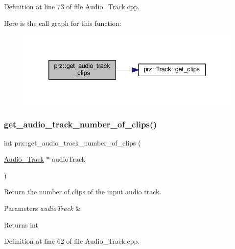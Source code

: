 Definition at line 73 of file Audio\+\_\+\+Track.\+cpp.

Here is the call graph for this function\+:
\nopagebreak
\begin{figure}[H]
\begin{center}
\leavevmode
\includegraphics[width=326pt]{namespaceprz_a291fc379c9ff52af1a7aaa0ac7736567_cgraph}
\end{center}
\end{figure}
\mbox{\label{namespaceprz_a8f5ec57a63ae029d8417d533e30965f4}} 
\subsubsection{\texorpdfstring{get\_audio\_track\_number\_of\_clips()}{get\_audio\_track\_number\_of\_clips()}}
{\footnotesize\ttfamily int prz\+::get\+\_\+audio\+\_\+track\+\_\+number\+\_\+of\+\_\+clips (\begin{DoxyParamCaption}\item[{\mbox{\hyperlink{classprz_1_1_audio___track}{Audio\+\_\+\+Track}} $\ast$}]{audio\+Track }\end{DoxyParamCaption})}



Return the number of clips of the input audio track. 


\begin{DoxyParams}{Parameters}
{\em audio\+Track} & \\
\hline
\end{DoxyParams}
\begin{DoxyReturn}{Returns}
int 
\end{DoxyReturn}


Definition at line 62 of file Audio\+\_\+\+Track.\+cpp.

